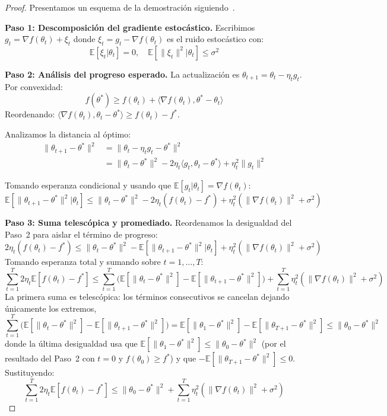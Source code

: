 \begin{proof}
	Presentamos un esquema de la demostración siguiendo~\citet{bottou2018optimization}.

	\textbf{Paso 1: Descomposición del gradiente estocástico.}
	Escribimos \(g_t = \nabla f(\theta_t) + \xi_t\) donde \(\xi_t = g_t - \nabla f(\theta_t)\) es el ruido estocástico con:
	\[
		\mathbb{E}[\xi_t | \theta_t] = 0, \quad \mathbb{E}[\|\xi_t\|^2 | \theta_t] \leq \sigma^2
	\]

	\textbf{Paso 2: Análisis del progreso esperado.}
	La actualización es \(\theta_{t+1} = \theta_t - \eta_t g_t\). Por convexidad:
	\[
		f(\theta^*) \geq f(\theta_t) + \langle \nabla f(\theta_t), \theta^* - \theta_t \rangle
	\]
	Reordenando: \(\langle \nabla f(\theta_t), \theta_t - \theta^* \rangle \geq f(\theta_t) - f^*\).

	Analizamos la distancia al óptimo:
	\begin{align*}
		\|\theta_{t+1} - \theta^*\|^2 &= \|\theta_t - \eta_t g_t - \theta^*\|^2 \\
		&= \|\theta_t - \theta^*\|^2 - 2\eta_t\langle g_t, \theta_t - \theta^* \rangle + \eta_t^2\|g_t\|^2
	\end{align*}

	Tomando esperanza condicional y usando que \(\mathbb{E}[g_t|\theta_t] = \nabla f(\theta_t)\):
	\[
		\mathbb{E}[\|\theta_{t+1} - \theta^*\|^2 | \theta_t] \leq \|\theta_t - \theta^*\|^2 - 2\eta_t(f(\theta_t) - f^*) + \eta_t^2(\|\nabla f(\theta_t)\|^2 + \sigma^2)
	\]

	\textbf{Paso 3: Suma telescópica y promediado.}
	Reordenamos la desigualdad del Paso~2 para aislar el término de progreso:
	\[
		2\eta_t(f(\theta_t) - f^*) \leq \|\theta_t - \theta^*\|^2 - \mathbb{E}[\|\theta_{t+1} - \theta^*\|^2 | \theta_t] + \eta_t^2(\|\nabla f(\theta_t)\|^2 + \sigma^2)
	\]
	Tomando esperanza total y sumando sobre \(t = 1, \ldots, T\):
	\[
		\sum_{t=1}^T 2\eta_t \mathbb{E}[f(\theta_t) - f^*] \leq \sum_{t=1}^T \Big(\mathbb{E}[\|\theta_t - \theta^*\|^2] - \mathbb{E}[\|\theta_{t+1} - \theta^*\|^2]\Big) + \sum_{t=1}^T \eta_t^2(\|\nabla f(\theta_t)\|^2 + \sigma^2)
	\]
	La primera suma es telescópica: los términos consecutivos se cancelan dejando únicamente los extremos,
	\[
		\sum_{t=1}^T \Big(\mathbb{E}[\|\theta_t - \theta^*\|^2] - \mathbb{E}[\|\theta_{t+1} - \theta^*\|^2]\Big) = \mathbb{E}[\|\theta_1 - \theta^*\|^2] - \mathbb{E}[\|\theta_{T+1} - \theta^*\|^2] \leq \|\theta_0 - \theta^*\|^2
	\]
	donde la última desigualdad usa que \(\mathbb{E}[\|\theta_1 - \theta^*\|^2] \leq \|\theta_0 - \theta^*\|^2\) (por el resultado del Paso~2 con \(t=0\) y \(f(\theta_0) \geq f^*\)) y que \(-\mathbb{E}[\|\theta_{T+1} - \theta^*\|^2] \leq 0\). Sustituyendo:
	\[
		\sum_{t=1}^T 2\eta_t \mathbb{E}[f(\theta_t) - f^*] \leq \|\theta_0 - \theta^*\|^2 + \sum_{t=1}^T \eta_t^2(\|\nabla f(\theta_t)\|^2 + \sigma^2)
	\]


\end{proof}
